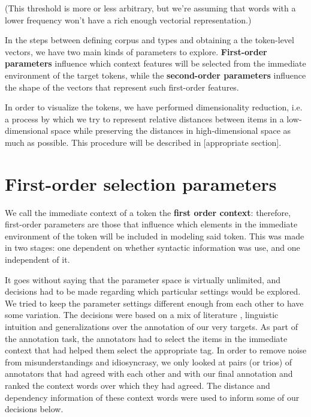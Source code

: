 \documentclass[
]{book}
\begin{document}
(This threshold is more or less arbitrary, but we're assuming that words with a lower frequency
won't have a rich enough vectorial representation.)

In the steps between defining corpus and types and obtaining a the token-level vectors,
we have two main kinds of parameters to explore.
\textbf{First-order parameters} influence which context features will be selected
from the immediate environment of the target tokens,
while the \textbf{second-order parameters} influence the shape of the vectors
that represent such first-order features.

In order to visualize the tokens, we have performed dimensionality reduction, i.e.
a process by which we try to represent relative distances between items in a low-dimensional space
while preserving the distances in high-dimensional space as much as possible.
This procedure will be described in {[}appropriate section{]}.

\hypertarget{first-order-selection-parameters}{%
\section{First-order selection parameters}\label{first-order-selection-parameters}}

We call the immediate context of a token the \textbf{first order context}: therefore,
first-order parameters are those that influence which elements in the immediate environment
of the token will be included in modeling said token. This was made in two stages:
one dependent on whether syntactic information was use, and one independent of it.

It goes without saying that the parameter space is virtually unlimited, and decisions
had to be made regarding which particular settings would be explored. We tried to
keep the parameter settings different enough from each other to have some variation.
The decisions were based on a mix of literature \autocite{kiela.clark_2014},
linguistic intuition and generalizations over the annotation of our very targets.
As part of the annotation task, the annotators had to select the items in the
immediate context that had helped them select the appropriate tag. In order to remove
noise from misunderstandings and idiosyncrasy, we only looked at pairs (or trios) of
annotators that had agreed with each other and with our final annotation and ranked
the context words over which they had agreed. The distance and dependency information
of these context words were used to inform some of our decisions below.
\end{document}
